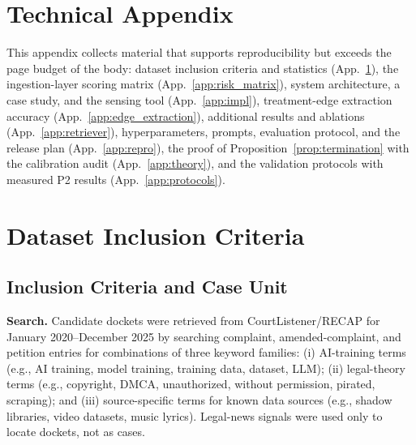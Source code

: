 
\clearpage %

\setcounter{table}{0}
\setcounter{figure}{0}
\renewcommand{\thetable}{A.\arabic{table}}
\renewcommand{\thefigure}{A.\arabic{figure}}

\section*{Technical Appendix}

This appendix collects material that supports reproducibility but exceeds the page budget of the body: dataset inclusion criteria and statistics (App.~\ref{app:full_schema}), the ingestion-layer scoring matrix (App.~\ref{app:risk_matrix}), system architecture, a case study, and the sensing tool (App.~\ref{app:impl}), treatment-edge extraction accuracy (App.~\ref{app:edge_extraction}), additional results and ablations (App.~\ref{app:retriever}), hyperparameters, prompts, evaluation protocol, and the release plan (App.~\ref{app:repro}), the proof of Proposition~\ref{prop:termination} with the calibration audit (App.~\ref{app:theory}), and the validation protocols with measured P2 results (App.~\ref{app:protocols}).

\section{Dataset Inclusion Criteria}
\label{app:full_schema}

\subsection{Inclusion Criteria and Case Unit}
\label{app:inclusion}

\textbf{Search.} Candidate dockets were retrieved from CourtListener/RECAP for January 2020--December 2025 by searching complaint, amended-complaint, and petition entries for combinations of three keyword families: (i) AI-training terms (e.g., AI training, model training, training data, dataset, LLM); (ii) legal-theory terms (e.g., copyright, DMCA, unauthorized, without permission, pirated, scraping); and (iii) source-specific terms for known data sources (e.g., shadow libraries, video datasets, music lyrics). Legal-news signals were used only to locate dockets, not as cases.

